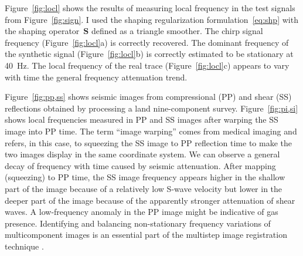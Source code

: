 Figure~\ref{fig:locl} shows the results of measuring local frequency
in the test signals from Figure~\ref{fig:sign}. I used the shaping
regularization formulation~\ref{eq:shp} with the shaping
operator~$\mathbf{S}$ defined as a triangle smoother. The chirp signal
frequency (Figure~\ref{fig:locl}a) is correctly recovered.  The
dominant frequency of the synthetic signal (Figure~\ref{fig:locl}b) is
correctly estimated to be stationary at 40~Hz. The local frequency of
the real trace (Figure~\ref{fig:locl}c) appears to vary with time
  the general frequency attenuation trend.




Figure~\ref{fig:pp,ss} shows seismic images from compressional (PP)
and shear (SS) reflections obtained by processing a land
nine-component survey. Figure~\ref{fig:pi,si} shows local frequencies
measured in PP and SS images after warping the SS image into PP time.
The term ``image warping'' comes from medical imaging \cite[]{wolberg}
and refers, in this case, to squeezing the SS image to PP reflection
time to make the two images display in the same coordinate system. We
can observe a general decay of frequency with time caused by seismic
attenuation. After mapping (squeezing) to PP time, the SS image
frequency appears higher in the shallow part of the image because of a
relatively low S-wave velocity but lower in the deeper part of the
image because of the apparently stronger attenuation of shear waves. A
low-frequency anomaly in the PP image might be indicative of gas
presence. Identifying and balancing non-stationary frequency
variations of multicomponent images is an essential part of the
multistep image registration technique
\cite[]{SEG-2003-07810784,warp}.

